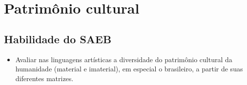 \chapter{Patrimônio cultural}


\section{Habilidade do SAEB} \enlargethispage{2\baselineskip}

\begin{itemize}
\item Avaliar nas linguagens artísticas a diversidade do patrimônio cultural
da humanidade (material e imaterial), em especial o brasileiro, a partir
de suas diferentes matrizes.
\end{itemize}

